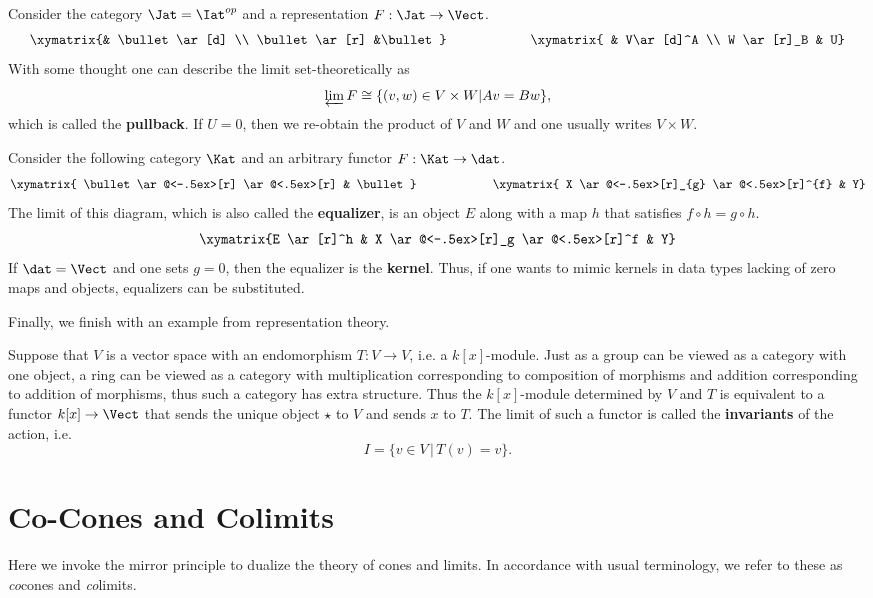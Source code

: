 \begin{ex}[Pullbacks]\label{ex:pullback}	
	Consider the category $\Jat=\Iat^{op}$ and a representation $F:\Jat\to\Vect$.
	\[
	\xymatrix{& \bullet\ar[d] \\ \bullet \ar[r] &\bullet}
	\qquad \qquad \qquad
	\xymatrix{ & V\ar[d]^A \\ W \ar[r]_B & U}
	\]
	With some thought one can describe the limit set-theoretically as
	\[
		\varprojlim F\cong \{(v,w)\in V\times W | Av=Bw\},
	\]
	which is called the \textbf{pullback}. If $U=0$, then we re-obtain the product of $V$ and $W$ and one usually writes $V\times W$. 
\end{ex}

\begin{ex}\label{ex:equalizer}
	Consider the following category $\Kat$ and an arbitrary functor $F:\Kat\to\dat$.
	\[
	 \xymatrix{ \bullet \ar@<-.5ex>[r] \ar@<.5ex>[r] & \bullet}
	\qquad \qquad \qquad
	 \xymatrix{ X \ar@<-.5ex>[r]_{g} \ar@<.5ex>[r]^{f} & Y}
	\]
	The limit of this diagram, which is also called the \textbf{equalizer}, is an object $E$ along with a map $h$ that satisfies $f\circ h=g\circ h$.
	\[
	 \xymatrix{E \ar[r]^h & X \ar@<-.5ex>[r]_g \ar@<.5ex>[r]^f & Y}
	\]
	If $\dat=\Vect$ and one sets $g=0$, then the equalizer is the \textbf{kernel}. Thus, if one wants to mimic kernels in data types lacking of zero maps and objects, equalizers can be substituted.
\end{ex}

Finally, we finish with an example from representation theory.

\begin{ex}[Invariants]\label{ex:invariants}
	Suppose that $V$ is a vector space with an endomorphism $T:V\to V$, i.e. a $k[x]$-module. Just as a group can be viewed as a category with one object, a ring can be viewed as a category with multiplication corresponding to composition of morphisms and addition corresponding to addition of morphisms, thus such a category has extra structure. Thus the $k[x]$-module determined by $V$ and $T$ is equivalent to a functor $k[x]\to\Vect$ that sends the unique object $\star$ to $V$ and sends $x$ to $T$. The limit of such a functor is called the \textbf{invariants} of the action, i.e.
	\[
		I=\{v\in V \, | \, T(v)=v\}.
	\]
\end{ex}

\section{Co-Cones and Colimits}
\label{subsec:colimits}
Here we invoke the mirror principle to dualize the theory of cones and limits. In accordance with usual terminology, we refer to these as \emph{co}cones and \emph{co}limits.

